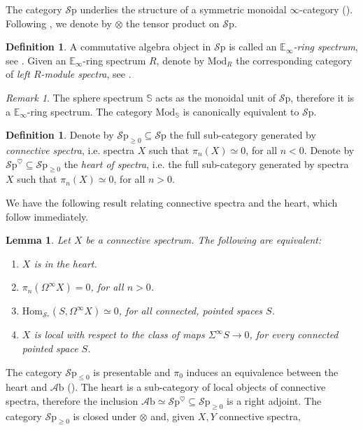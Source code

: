 \documentclass[10pt]{amsart}
\newcommand{\bE}{\mathbb{E}}
\newcommand{\s}{\mathscr{S}}
\newcommand{\bS}{\mathbb{S}}
\newcommand{\Hom}{\mathrm{Hom}}
\newcommand{\Sp}{\mathscr{S}\mathrm{p}}
\newcommand{\Mod}{\mathrm{Mod}}
\newcommand{\Ab}{\mathscr{A}\mathrm{b}}
\newcommand{\nrnote}[1]{\todo[color=green!40,linecolor=green!40!black,size=\tiny]{#1}}
\newtheorem{lemma}[equation]{Lemma}
\theoremstyle{definition}
\newtheorem{definition}[equation]{Definition}
\theoremstyle{remark}
\newtheorem{remark}[equation]{Remark}
\begin{document}
  The category $\Sp$ underlies the structure of a symmetric monoidal $\infty$-category (\cite[Corollary 4.8.2.19]{lurie2017ha}). Following \cite{lurie2017ha}, we denote by $\otimes$ the tensor product on $\Sp$.
  \begin{definition}
    A commutative algebra object in $\Sp$ is called an \emph{$\bE_\infty$-ring spectrum}, see \cite[Definition 7.1.0.1]{lurie2017ha}. Given an $\bE_\infty$-ring spectrum $R$, denote by $\Mod_R$ the corresponding category of \emph{left $R$-module spectra}, see \cite[Definition 7.1.1.2]{lurie2017ha}. 
  \end{definition}
  \begin{remark}
    The sphere spectrum $\bS$ acts as the monoidal unit of $\Sp$, therefore it is a $\bE_\infty$-ring spectrum. The category $\Mod_{\bS}$ is canonically equivalent to $\Sp$. 
  \end{remark}
    \begin{definition}
    Denote by $\Sp_{\geq0}\subseteq\Sp$ the full sub-category generated by \emph{connective spectra}, i.e. spectra $X$ such that $\pi_n(X)\simeq0$, for all $n<0$. Denote by $\Sp^\heartsuit\subseteq\Sp_{\geq0}$ the \emph{heart of spectra}, i.e. the full sub-category generated by spectra $X$ such that $\pi_n(X)\simeq0$, for all $n>0$.
  \end{definition}
  We have the following result relating connective spectra and the heart, which follow immediately.
  \begin{lemma}
  Let $X$ be a connective spectrum. The following are equivalent:
  \begin{enumerate}
    \item $X$ is in the heart. 
    \item $\pi_n(\Omega^\infty X)=0$, for all $n>0$.
    \item $\Hom_{\s_*}(S,\Omega^\infty X)\simeq0$, for all connected, pointed spaces $S$.
    \item $X$ is local with respect to the class of maps $\Sigma^\infty S\to0$, for every connected pointed space $S$.
  \end{enumerate}
  \end{lemma}

  The category $\Sp_{\leq0}$\nrnote{Is the direction correct here?} is presentable and $\pi_0$ induces an equivalence between the heart and $\Ab$ (\cite[Proposition 1.4.3.6]{lurie2017ha}). The heart is a sub-category of local objects of connective spectra, therefore the inclusion $\Ab\simeq\Sp^\heartsuit\subseteq\Sp_{\geq0}$ is a right adjoint. The category $\Sp_{\geq0}$ is closed under $\otimes$ and, given $X,Y$ connective spectra, 
\end{document}
